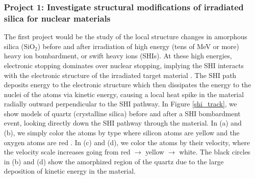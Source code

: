 \subsubsection*{Project 1: Investigate structural modifications of irradiated silica for nuclear materials}\label{lang}

The first project would be the study of the local structure changes in amorphous silica ($ \textrm{SiO}_2 $) before and after irradiation of high energy
(tens of MeV or more) heavy ion bombardment, or swift heavy ions (SHIs). At these high energies, electronic stopping dominates over nuclear stopping, implying the SHI interacts with the electronic structure of the irradiated target material \cite{Klaumunzer2004136, Krasheninnikov2010, Weber2015}. The SHI path deposits energy to the electronic structure which then dissipates the energy to the nuclei of the atoms via kinetic energy, causing a local heat spike in the material radially outward perpendicular to the SHI pathway. In Figure \ref{shi_track}, we show models of quartz (crystalline silica) before and after a SHI bombardment event, looking directly down the SHI pathway through the material. In (a) and (b), we simply color the atoms by type where silicon atoms are \color{Dandelion} yellow \color{black} and the oxygen atoms are \color{BrickRed} red \color{black}. In (c) and (d), we color the atoms by their velocity, where the velocity scale increases going from \color{BrickRed} red \color{black} $\to$ \color{Dandelion} yellow \color{black} $\to$ \color{black} white. The black circles in (b) and (d) show the amorphized region of the quartz due to the large deposition of kinetic energy in the material.

